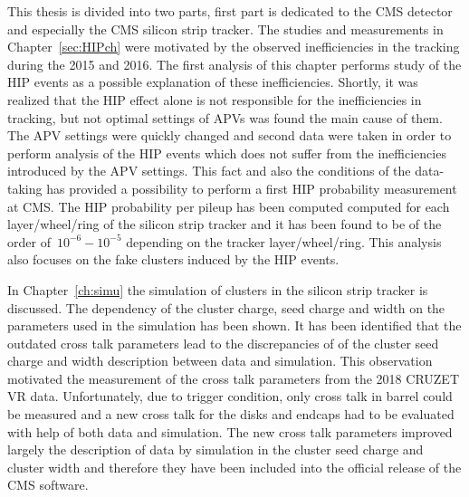 

This thesis is divided into two parts, first part is dedicated to the CMS detector and especially the CMS silicon strip tracker. The studies and measurements in Chapter~\ref{sec:HIPch} were motivated by the observed inefficiencies in the tracking during the 2015 and 2016. The first analysis of this chapter performs study of the HIP events as a possible explanation of these inefficiencies. Shortly, it was realized that the HIP effect alone is not responsible for the inefficiencies in tracking, but not optimal settings of APVs was found the main cause of them.  The APV settings were quickly changed and second data were taken in order to perform analysis of the HIP events which does not suffer from the inefficiencies introduced by the APV settings. This fact and also the conditions of the data-taking has provided a possibility to perform a first HIP probability measurement at CMS. The HIP probability per pileup has been computed computed for each layer/wheel/ring of the silicon strip tracker and it has been found to be of the order of~$10^{-6}-10^{-5}$ depending on the tracker layer/wheel/ring. This analysis also focuses on the fake clusters induced by the HIP events. 

In Chapter~\ref{ch:simu} the simulation of clusters in the silicon strip tracker is discussed. The dependency of the cluster charge, seed charge and width on the parameters used in the simulation has been shown. It has been identified that the outdated cross talk parameters lead to the discrepancies of of the cluster seed charge and width description between data and simulation. This observation motivated the measurement of the cross talk parameters from the 2018 CRUZET VR data. Unfortunately, due to trigger condition, only cross talk in barrel could be measured and a new cross talk for the disks and endcaps had to be evaluated with help of both data and simulation. The new cross talk parameters improved largely the description of data by simulation in the cluster seed charge and cluster width and therefore they have been included into the official release of the CMS software.

